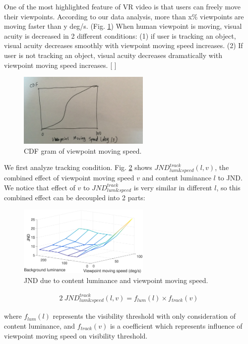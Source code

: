 One of the most highlighted feature of VR video is that users can freely move their viewpoints. According to our data analysis, more than x\% viewpoints are moving faster than y deg/s. (Fig. \ref{CDFspeed}) When human viewpoint is moving, visual acuity is decreased in 2 different conditions: (1) if user is tracking an object, visual acuity decreases smoothly with viewpoint moving speed increases. (2) If user is not tracking an object, visual acuity decreases dramatically with viewpoint moving speed increases. [ ]

\begin{figure}
  \centering
  \includegraphics[width=2.5in]{images/movingspeedCDF.jpeg}
  \caption{CDF gram of viewpoint moving speed.}
  \label{CDFspeed}
  \end{figure}
  
We first analyze tracking condition. Fig. \ref{JNDspeed-lum-track} shows $JND_{lum\&speed}^{track}(l, v)$, the combined effect of viewpoint moving speed $v$ and content luminance $l$ to JND. We notice that effect of $v$ to $JND_{lum\&speed}^{track}$ is very similar in different $l$, so this combined effect can be decoupled into 2 parts:

\begin{figure}
  \centering
  \includegraphics[width=2.5in]{images/JNDspeed-lum.eps}
  \caption{JND due to content luminance and viewpoint moving speed.}
  \label{JNDspeed-lum-track}
  \end{figure}

\begin{alignat}{2}\
JND_{lum\&speed}^{track}(l, v) = f_{lum}(l) \times f_{track}(v)
\end{alignat}

where $f_{lum}(l)$ represents the visibility threshold with only consideration of content luminance, and $f_{track}(v)$ is a coefficient which represents influence of viewpoint moving speed on visibility threshold.

